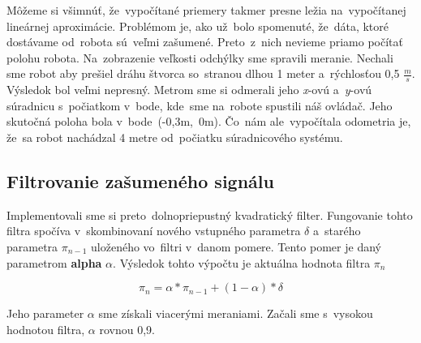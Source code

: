 Môžeme si všimnúť, že~vypočítané priemery takmer presne ležia na~vypočítanej lineárnej aproximácie. Problémom je, ako už~bolo spomenuté, že~dáta,
ktoré dostávame od~robota sú~veľmi zašumené. Preto~z~nich nevieme priamo počítať polohu robota. Na~zobrazenie veľkosti odchýlky sme spravili
meranie. Nechali sme robot aby prešiel dráhu štvorca so~stranou dlhou 1 meter a~rýchlosťou 0,5 \(\frac{m}{s}\). Výsledok bol veľmi nepresný.
Metrom sme si odmerali jeho \textit{x}-ovú a~\textit{y}-ovú súradnicu s~počiatkom v~bode, kde~sme na~robote spustili náš ovládač. Jeho skutočná
poloha bola v~bode~(-0,3m,~0m). Čo~nám ale~vypočítala odometria je, že~sa robot nachádzal 4 metre od~počiatku súradnicového systému.

\subsection{Filtrovanie zašumeného signálu}

Implementovali sme si preto~dolnopriepustný kvadratický filter. Fungovanie tohto filtra spočíva v~skombinovaní nového
vstupného parametra $\delta$ a~starého parametra $\pi_{n-1}$ uloženého vo~filtri v~danom pomere. Tento pomer je daný
parametrom \textbf{alpha} $\alpha$. Výsledok tohto výpočtu je aktuálna hodnota filtra $\pi_n$

\begin{equation}
	\pi_n = \alpha * \pi_{n-1} + (1 - \alpha) * \delta
	\label{eq:stateOfFilter}
\end{equation}

Jeho parameter $\alpha$ sme získali viacerými meraniami. Začali sme s~vysokou hodnotou filtra, $\alpha$ rovnou  0,9.

